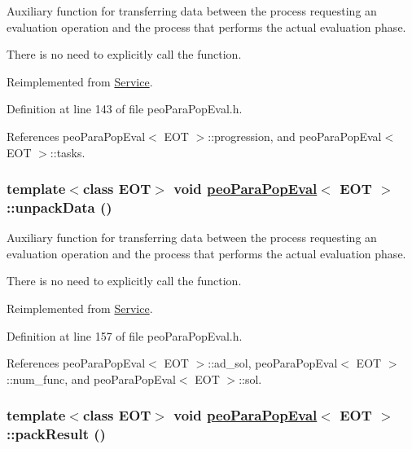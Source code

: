 Auxiliary function for transferring data between the process requesting an evaluation operation and the process that performs the actual evaluation phase. 

There is no need to explicitly call the function. 

Reimplemented from \hyperlink{classService_aea4b8f7f8fb88e83862ee4bfd9ab207}{Service}.

Definition at line 143 of file peo\-Para\-Pop\-Eval.h.

References peo\-Para\-Pop\-Eval$<$ EOT $>$::progression, and peo\-Para\-Pop\-Eval$<$ EOT $>$::tasks.\hypertarget{classpeoParaPopEval_410bf4c173e2f36df82251cb16ce1b05}{
\subsubsection[unpackData]{\setlength{\rightskip}{0pt plus 5cm}template$<$class EOT$>$ void \hyperlink{classpeoParaPopEval}{peo\-Para\-Pop\-Eval}$<$ EOT $>$::unpack\-Data ()}}
\label{classpeoParaPopEval_410bf4c173e2f36df82251cb16ce1b05}


Auxiliary function for transferring data between the process requesting an evaluation operation and the process that performs the actual evaluation phase. 

There is no need to explicitly call the function. 

Reimplemented from \hyperlink{classService_3bd87b444710813d30fd754d4d0b4df3}{Service}.

Definition at line 157 of file peo\-Para\-Pop\-Eval.h.

References peo\-Para\-Pop\-Eval$<$ EOT $>$::ad\_\-sol, peo\-Para\-Pop\-Eval$<$ EOT $>$::num\_\-func, and peo\-Para\-Pop\-Eval$<$ EOT $>$::sol.\hypertarget{classpeoParaPopEval_24bb4ae84b0b9f64e7170e3d2b0e1223}{
\subsubsection[packResult]{\setlength{\rightskip}{0pt plus 5cm}template$<$class EOT$>$ void \hyperlink{classpeoParaPopEval}{peo\-Para\-Pop\-Eval}$<$ EOT $>$::pack\-Result ()}}
\label{classpeoParaPopEval_24bb4ae84b0b9f64e7170e3d2b0e1223}


